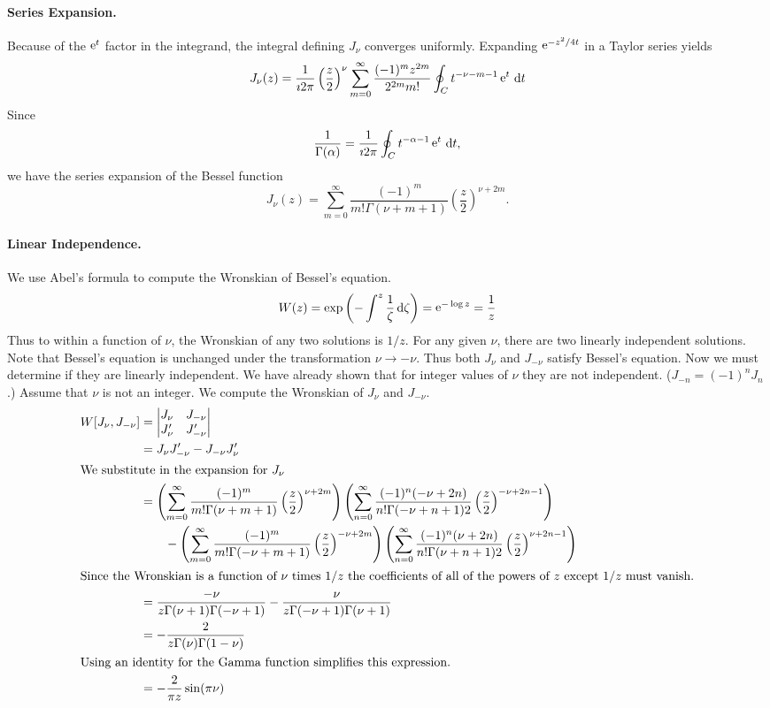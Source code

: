 \paragraph{Series Expansion.}
Because of the $\mathop{\mathrm{e}}\nolimits^t$ factor in the integrand, the integral defining $J_\nu$
converges uniformly.  Expanding $\mathop{\mathrm{e}}\nolimits^{-z^2/4t}$ in a Taylor series yields
\[ 
J_\nu(z) = \frac{1}{\imath 2 \pi} \left(\frac{z}{2}\right)^\nu \sum_{m = 0}^\infty
\frac{(-1)^m z^{2m}}{2^{2m} m!} \oint_C t^{-\nu-m-1} \mathop{\mathrm{e}}\nolimits^t\,\mathrm{d} t 
\]
Since
\[ 
\frac{1}{\Gamma(\alpha)} = \frac{1}{\imath 2 \pi} \oint_C t^{-\alpha-1} \mathop{\mathrm{e}}\nolimits^t\,\mathrm{d} t,
\]
we have the series expansion of the Bessel function
\[ 
\boxed{
J_\nu(z) = \sum_{m = 0}^\infty \frac{(-1)^m}{m! \Gamma(\nu+m+1)} 
  \left( \frac{z}{2} \right)^{\nu+2m}.
  }
\]




\paragraph{Linear Independence.}
We use Abel's formula to compute the Wronskian of Bessel's equation.
\[ 
W(z) = \exp\left(-\int^z \frac{1}{\zeta}\,\mathrm{d} \zeta \right)
= \mathop{\mathrm{e}}\nolimits^{-\log z} = \frac{1}{z}
\]
Thus to within a function of $\nu$, the Wronskian of any two solutions is $1/z$.
For any given 
$\nu$, there are two linearly independent solutions.
Note that Bessel's equation is unchanged under the transformation $\nu \to 
-\nu$. Thus both $J_\nu$ and $J_{-\nu}$ satisfy Bessel's equation.  
Now we must determine if they are linearly independent.  We have already
shown that for integer values of $\nu$ they are not independent.
($J_{-n} = (-1)^n J_n$.)  Assume that $\nu$ is not an integer.
We compute the Wronskian of $J_\nu$ and $J_{-\nu}$.
\begin{align*}
  W[J_\nu, J_{-\nu}]
  &= \begin{vmatrix}
    J_\nu   &       J_{-\nu}        \\
    J_\nu'  &       J_{-\nu}'
  \end{vmatrix} 
  \\
  &= J_\nu J_{-\nu}' - J_{-\nu} J_\nu' 
  \\
  \intertext{We substitute in the expansion for $J_\nu$}
  &= \left( \sum_{m = 0}^\infty \frac{(-1)^m}{m! \Gamma(\nu+m+1)} 
    \left(\frac{z}{2}\right)^{\nu+2m} \right)
  \left( \sum_{n = 0}^\infty \frac{(-1)^n (-\nu+2n)}{n! \Gamma(-\nu+n+1)2}
    \left(\frac{z}{2}\right)^{-\nu+2n-1}\right) 
  \\
  &\qquad - 
  \left( \sum_{m = 0}^\infty \frac{(-1)^m}{m! \Gamma(-\nu+m+1)} 
    \left(\frac{z}{2}\right)^{-\nu+2m} \right)
  \left( \sum_{n = 0}^\infty \frac{(-1)^n (\nu+2n)}{n! \Gamma(\nu+n+1)2}
    \left(\frac{z}{2}\right)^{\nu+2n-1}\right)
  \\ 
  \intertext{Since the Wronskian is a function of $\nu$ times $1/z$ the 
    coefficients of all of the powers of $z$ except $1/z$ must vanish.}
  &= \frac{-\nu}{z \Gamma(\nu+1) \Gamma(-\nu+1)}
  - \frac{\nu}{z \Gamma(-\nu+1) \Gamma(\nu+1)} 
  \\
  &= - \frac{2}{z \Gamma(\nu) \Gamma(1-\nu)} 
  \\
  \intertext{Using an identity for the Gamma function simplifies this 
    expression.}
  &= -\frac{2}{\pi z} \sin(\pi \nu)
\end{align*}
